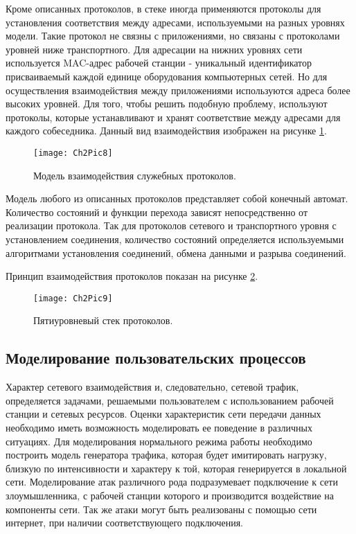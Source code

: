     Кроме описанных протоколов, в стеке иногда применяются протоколы для установления соответствия между адресами, используемыми на разных уровнях модели. Такие протокол не связны с приложениями, но связаны с протоколами уровней ниже транспортного. Для адресации на нижних уровнях сети используется MAC-адрес рабочей станции - уникальный идентификатор присваиваемый каждой единице оборудования компьютерных сетей. Но для осуществления взаимодействия между приложениями используются адреса более высоких уровней. Для того, чтобы решить подобную проблему, используют протоколы, которые устанавливают и хранят соответствие между адресами для каждого собеседника. Данный вид взаимодействия изображен на рисунке
    \ref{Pic8}.
    \begin{figure}\center
        \texttt{[image: Ch2Pic8]}
        \caption{Модель взаимодействия служебных протоколов.} \label{Pic8}
    \end{figure}

    Модель любого из описанных протоколов представляет собой конечный автомат. Количество состояний и функции перехода зависят непосредственно от реализации протокола. Так для протоколов сетевого и транспортного уровня с установлением соединения, количество состояний определяется используемыми алгоритмами установления соединений, обмена данными и разрыва соединений.

    Принцип взаимодействия протоколов показан на рисунке \ref{Pic9}.

    \begin{figure}\center
        \texttt{[image: Ch2Pic9]}
        \caption{Пятиуровневый стек протоколов.} \label{Pic9}
    \end{figure}

    \subsection{Моделирование пользовательских процессов}

    Характер сетевого взаимодействия и, следовательно, сетевой трафик, определяется задачами, решаемыми пользователем с использованием рабочей станции и сетевых ресурсов. Оценки характеристик сети передачи данных необходимо иметь возможность моделировать ее поведение в различных ситуациях. Для моделирования нормального режима работы необходимо построить модель генератора трафика, которая будет имитировать нагрузку, близкую по интенсивности и характеру к той, которая генерируется в локальной сети. Моделирование атак различного рода подразумевает подключение к сети злоумышленника, с рабочей станции которого и производится воздействие на компоненты сети. Так же атаки могут быть реализованы с помощью сети интернет, при наличии соответствующего подключения.


